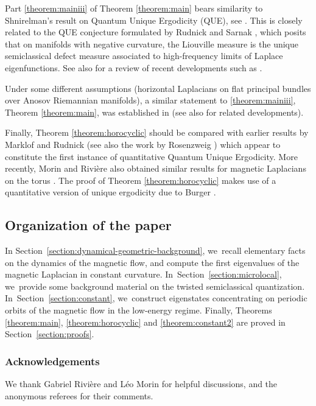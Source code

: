 \documentclass[JEP,XML,SOM,Unicode,published]{cedram}
\theoremstyle{plain}
\theoremstyle{definition}
\begin{document}
Part \eqref{theorem:mainiii} of Theorem \ref{theorem:main} bears similarity to Shnirelman's
result on Quantum Unique Ergodicity (QUE), see
\cite{Shnirelman-74-1,Shnirelman-74-2,Colindeverdiere-85,Zelditch-87}. This is closely related to the QUE
conjecture formulated by Rudnick and Sarnak \cite{Rudnick-Sarnak-94}, which
posits that on manifolds with negative curvature, the Liouville measure is the
unique semiclassical defect measure associated to high-frequency limits of
Laplace eigenfunctions. See also \cite{Dyatlov-22} for a review of recent developments {\color{black}such as \cite{Lindenstrauss-06,Anantharaman-08, Dyatlov-Jin-18}}.

Under some different assumptions (horizontal Laplacians on flat principal bundles over Anosov Riemannian manifolds), a similar statement to \eqref{theorem:mainiii}, Theorem \ref{theorem:main}, was established in \cite[Th.\,5.1.8]{Cekic-Lefeuvre-24} (see also \cite{Ma-Ma-23} for related developments).

Finally, Theorem \ref{theorem:horocyclic} should be compared with earlier results by Marklof and Rudnick \cite{Marklof-Rudnick-00} (see also the work by Rosenzweig \cite{Rosenzweig-06}) which appear to constitute the first instance of quantitative Quantum Unique Ergodicity. More recently, Morin and Rivière also obtained similar results for magnetic Laplacians on the torus \cite{Morin-Riviere-24}. The proof of Theorem \ref{theorem:horocyclic} makes use of a quantitative version of unique ergodicity due to Burger \cite{Burger-90}.

\subsection{Organization of the paper} In Section~\ref{section:dynamical-geometric-background}, we~recall elementary facts on the dynamics of the magnetic flow, and compute the first eigenvalues of the magnetic Laplacian in constant curvature. In~Section~\ref{section:microlocal}, we~provide some background material on the twisted semiclassical quantization. In~Section~\ref{section:constant}, we~construct eigenstates concentrating on periodic orbits of the magnetic flow in the low-energy regime. Finally, Theorems \ref{theorem:main}, \ref{theorem:horocyclic} and \ref{theorem:constant2} are proved in Section~\ref{section:proofs}.

\subsubsection*{Acknowledgements} We thank Gabriel Rivière and Léo Morin for helpful discussions, and the anonymous referees for their comments.
\end{document}
